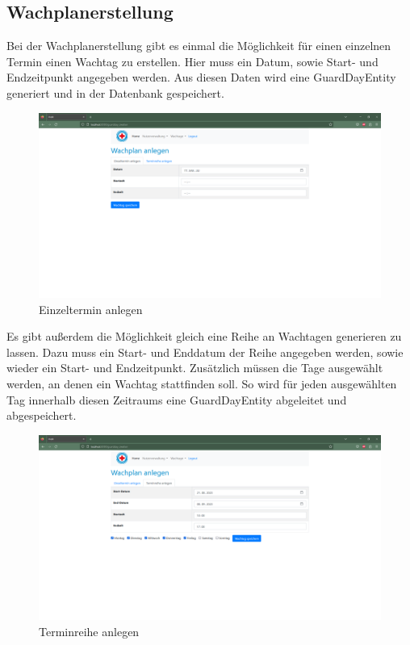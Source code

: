 \documentclass[fontsize=12pt,openright,oneside,paper=a4,BCOR=1cm]{scrbook}
\begin{document}
\subsection{Wachplanerstellung}

Bei der Wachplanerstellung gibt es einmal die M\"oglichkeit f\"ur einen einzelnen Termin einen Wachtag zu erstellen. Hier muss ein Datum, sowie Start- und Endzeitpunkt angegeben werden. Aus diesen Daten wird eine \glqq GuardDayEntity\grqq{} generiert und in der Datenbank gespeichert. 

\begin{figure}[H]
  \centering
    \includegraphics[width=0.7\linewidth]{Anlagen/Anwendung/6WachplananlegenSingle.png}
    \caption{Einzeltermin anlegen}
  \label{fig:anwendung-wachplanSingle}
\end{figure}

Es gibt au{\ss}erdem die M\"oglichkeit gleich eine Reihe an Wachtagen generieren zu lassen. Dazu muss ein Start- und Enddatum der Reihe angegeben werden, sowie wieder ein Start- und Endzeitpunkt. Zus\"atzlich m\"ussen die Tage ausgew\"ahlt werden, an denen ein Wachtag stattfinden soll. So wird f\"ur jeden ausgew\"ahlten Tag innerhalb diesen Zeitraums eine \glqq GuardDayEntity\grqq{} abgeleitet und abgespeichert.

\begin{figure}[H]
  \centering
    \includegraphics[width=0.7\linewidth]{Anlagen/Anwendung/6WachplananlegenMultipleBefullt.png}
    \caption{Terminreihe anlegen}
  \label{fig:anwendung-wachplanMultiple}
\end{figure}
\end{document}
